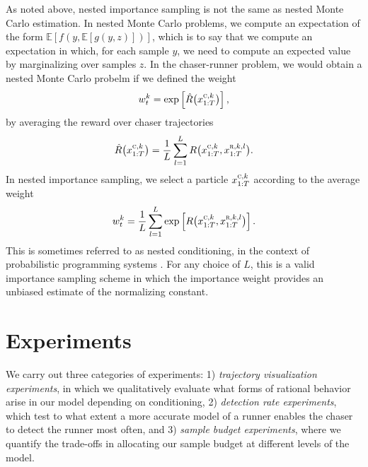 \documentclass[twoside]{article}
\begin{document}
As noted above, nested importance sampling is not the same as nested Monte Carlo estimation. In nested Monte Carlo problems, we compute an expectation of the form $\mathbb{E}[f(y, \mathbb{E}[g(y, z)])]$, which is to say that we compute an expectation in which, for each sample $y$, we need to compute an expected value by marginalizing over samples $z$. In the chaser-runner problem, we would obtain a nested Monte Carlo probelm if we defined the weight
\[
    w^k_t 
    = 
    \exp
    \left[
        \hat{R}\big(
            x^{\textsc{c}, k}_{1:T}
            \big)
    \right],
\]
by averaging the reward over chaser trajectories
\[
    \hat{R}\big(
        x^{\textsc{c}, k}_{1:T}
    \big)
    =
    \frac{1}{L}
    \sum_{l=1}^L
    R
    \big(
        x^{\textsc{c}, k}_{1:T},
        x^{\textsc{r}, k, l}_{1:T}
    \big)
    .
\]
In nested importance sampling, we select a particle $x^{\textsc{c}, k}_{1:T}$ according to the average weight 
\[
    w^k_t 
    = 
    \frac{1}{L}    
    \sum_{l=1}^L
    \exp 
    \left[
    R
    \big(
        x^{\textsc{c}, k}_{1:T},
        x^{\textsc{r}, k, l}_{1:T}
    \big)
    \right].
\]
This is sometimes referred to as nested conditioning, in the context of probabilistic programming systems \cite{rainforth2018nestingb}.
For any choice of $L$, this is a valid importance sampling scheme in which the importance weight provides an unbiased estimate of the normalizing constant.


\vspace{-0.25em}
\section{Experiments}
\vspace{-0.25em}

We carry out three categories of experiments: 1) \textit{trajectory visualization experiments}, in which we qualitatively evaluate what forms of rational behavior arise in our model depending on conditioning, 2) \textit{detection rate experiments}, which test to what extent a more accurate model of a runner enables the chaser to detect the runner most often, and 3) \textit{sample budget experiments}, where we quantify the trade-offs in allocating our sample budget at different levels of the model. 
\end{document}
